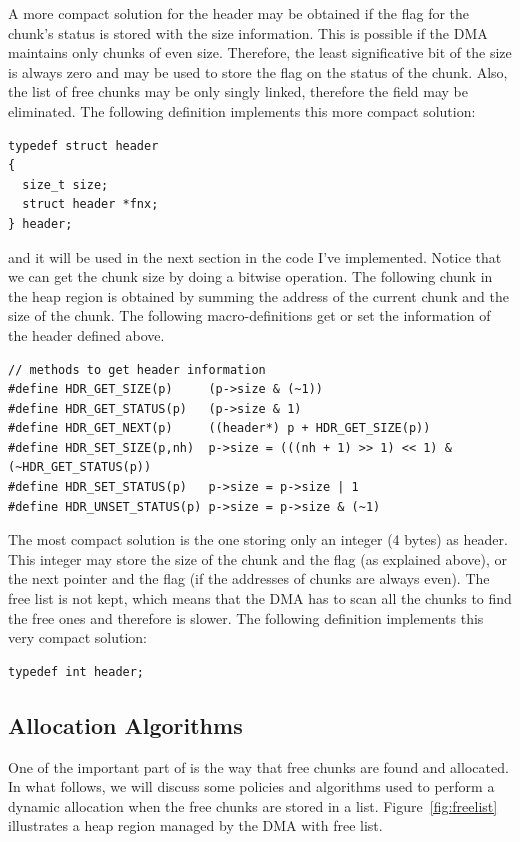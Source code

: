 A more compact solution for the header may be obtained if the flag for the chunk's status is stored with the size information. This is possible if the DMA maintains only chunks of even size. Therefore, the least significative bit of the size is always zero and may be used to store the flag on the status of the chunk.
Also, the list of free chunks may be only singly linked, therefore the  field may be eliminated.
The following definition implements this more compact solution:
\begin{lstlisting}[style=cstyle]
typedef struct header
{
  size_t size;			
  struct header *fnx;
} header;
\end{lstlisting}
and it will be used in the next section in the code I've implemented.
Notice that we can get the chunk size by doing a bitwise operation. 
The following chunk in the heap region is obtained by summing the address of the current chunk and the size of the chunk. The following macro-definitions get or set the information of the header defined above.
\begin{lstlisting}[style=cstyle]
// methods to get header information
#define HDR_GET_SIZE(p)     (p->size & (~1))
#define HDR_GET_STATUS(p)   (p->size & 1)
#define HDR_GET_NEXT(p)     ((header*) p + HDR_GET_SIZE(p))
#define HDR_SET_SIZE(p,nh)  p->size = (((nh + 1) >> 1) << 1) & (~HDR_GET_STATUS(p))
#define HDR_SET_STATUS(p)   p->size = p->size | 1
#define HDR_UNSET_STATUS(p) p->size = p->size & (~1)
\end{lstlisting}

The most compact solution is the one storing only an integer (4 bytes) as header. This integer may store the size of the chunk and the flag (as explained above), or the next pointer and the flag (if the addresses of chunks are always even).
The free list is not kept, which means that the DMA has to scan all the chunks to find the free ones and therefore is slower.
The following definition implements this very compact solution:
\begin{lstlisting}[style=cstyle]
typedef int header;
\end{lstlisting}


\subsection{Allocation Algorithms}
One of the important part of  is the way that free chunks are found and allocated. In what follows, we will discuss some policies and algorithms used to perform a dynamic allocation when the free chunks are stored in a list.
Figure~\ref{fig:freelist} illustrates a heap region managed by the DMA with free list.

